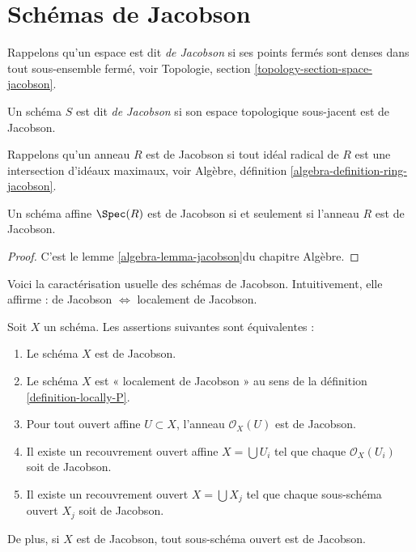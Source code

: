 \section{Schémas de Jacobson}
\label{section-jacobson}

\noindent
Rappelons qu'un espace est dit {\it de Jacobson} si ses points fermés sont
denses dans tout sous-ensemble fermé,
voir Topologie, section \ref{topology-section-space-jacobson}.

\begin{definition}
\label{definition-jacobson}
Un schéma $S$ est dit {\it de Jacobson} si son espace topologique
sous-jacent est de Jacobson.
\end{definition}

\noindent
Rappelons qu'un anneau $R$ est de Jacobson si tout idéal radical de $R$
est une intersection d'idéaux maximaux, voir
Algèbre, définition \ref{algebra-definition-ring-jacobson}.

\begin{lemma}
\label{lemma-affine-jacobson}
Un schéma affine $\Spec(R)$ est de Jacobson si et seulement
si l'anneau $R$ est de Jacobson.
\end{lemma}

\begin{proof}
C'est le lemme \ref{algebra-lemma-jacobson}du chapitre Algèbre.
\end{proof}

\noindent
Voici la caractérisation usuelle des schémas de Jacobson.
Intuitivement, elle affirme : de Jacobson $\Leftrightarrow$ localement de Jacobson.

\begin{lemma}
\label{lemma-locally-jacobson}
Soit $X$ un schéma. Les assertions suivantes sont équivalentes :
\begin{enumerate}
\item Le schéma $X$ est de Jacobson.
\item Le schéma $X$ est « localement de Jacobson » au sens de la
définition \ref{definition-locally-P}.
\item Pour tout ouvert affine $U \subset X$, l'anneau $\mathcal{O}_X(U)$
est de Jacobson.
\item Il existe un recouvrement ouvert affine $X = \bigcup U_i$ tel que
chaque $\mathcal{O}_X(U_i)$ soit de Jacobson.
\item Il existe un recouvrement ouvert $X = \bigcup X_j$
tel que chaque sous-schéma ouvert $X_j$ soit de Jacobson.
\end{enumerate}
De plus, si $X$ est de Jacobson, tout sous-schéma ouvert
est de Jacobson.
\end{lemma}

